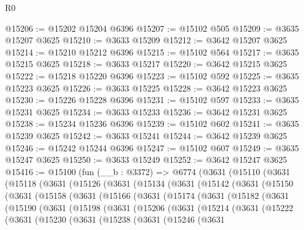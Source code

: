 \begin{lexlean}{R0}
\begin{coremodule}
@15206 := @15202 @15204 @6396
@15207 := @15102 @505
@15209 := @3635 @15207 @3625
@15210 := @3633 @15209
@15212 := @3642 @15207 @3625
@15214 := @15210 @15212 @6396
@15215 := @15102 @564
@15217 := @3635 @15215 @3625
@15218 := @3633 @15217
@15220 := @3642 @15215 @3625
@15222 := @15218 @15220 @6396
@15223 := @15102 @592
@15225 := @3635 @15223 @3625
@15226 := @3633 @15225
@15228 := @3642 @15223 @3625
@15230 := @15226 @15228 @6396
@15231 := @15102 @597
@15233 := @3635 @15231 @3625
@15234 := @3633 @15233
@15236 := @3642 @15231 @3625
@15238 := @15234 @15236 @6396
@15239 := @15102 @602
@15241 := @3635 @15239 @3625
@15242 := @3633 @15241
@15244 := @3642 @15239 @3625
@15246 := @15242 @15244 @6396
@15247 := @15102 @607
@15249 := @3635 @15247 @3625
@15250 := @3633 @15249
@15252 := @3642 @15247 @3625
@15416 := @15100
    (fun (__b : @3372) =>
    @6774
      (@3631
        (@15110
          (@3631
            (@15118
              (@3631
                (@15126
                  (@3631
                    (@15134
                      (@3631
                        (@15142
                          (@3631
                            (@15150
                              (@3631
                                (@15158
                                  (@3631
                                    (@15166
                                      (@3631
                                        (@15174
                                          (@3631
                                            (@15182
                                              (@3631
                                                (@15190
                                                  (@3631
                                                    (@15198
                                                      (@3631
                                                        (@15206
                                                          (@3631
                                                            (@15214
                                                              (@3631
                                                                (@15222
                                                                  (@3631
                                                                    (@15230
                                                                      (@3631
                                                                        (@15238
                                                                          (@3631
                                                                            (@15246
                                                                              (@3631

\end{coremodule}
\end{lexlean}
